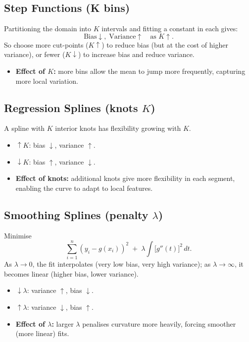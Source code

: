\documentclass{article}
\begin{document}
\subsection{Step Functions (K bins)}
Partitioning the domain into \(K\) intervals and fitting a constant in each gives:
\[
\text{Bias}\downarrow,\;\text{Variance}\uparrow
\quad\text{as }K\!\!\uparrow.
\]
So choose more cut-points (\(K\uparrow\)) to reduce bias (but at the cost of higher variance), or fewer (\(K\downarrow\)) to increase bias and reduce variance.
\begin{itemize}
  \item \textbf{Effect of \(K\):} more bins allow the mean to jump more frequently, capturing more local variation.
\end{itemize}

\subsection{Regression Splines (knots \(K\))}
A spline with \(K\) interior knots has flexibility growing with \(K\).
\begin{itemize}
  \item \(\uparrow K\): bias \(\downarrow\), variance \(\uparrow\).
  \item \(\downarrow K\): bias \(\uparrow\), variance \(\downarrow\).
  \item \textbf{Effect of knots:} additional knots give more flexibility in each segment, enabling the curve to adapt to local features.
\end{itemize}

\subsection{Smoothing Splines (penalty \(\lambda\))}
Minimise
\[
\sum_{i=1}^n (y_i - g(x_i))^2 \;+\;\lambda \int \bigl[g''(t)\bigr]^2\,dt.
\]
As \(\lambda\to0\), the fit interpolates (very low bias, very high variance); as \(\lambda\to\infty\), it becomes linear (higher bias, lower variance).
\begin{itemize}
  \item \(\downarrow\lambda\): variance \(\uparrow\), bias \(\downarrow\).
  \item \(\uparrow\lambda\): variance \(\downarrow\), bias \(\uparrow\).
  \item \textbf{Effect of \(\lambda\):} larger \(\lambda\) penalises curvature more heavily, forcing smoother (more linear) fits.
\end{itemize}
\end{document}
